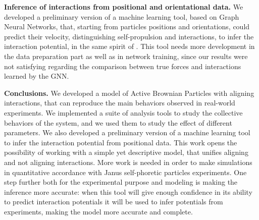 \documentclass[a4paper, notitlepage]{report} %
\begin{document}
	
	\textbf{Inference of interactions from positional and orientational data.} 
	We developed a preliminary version of a machine learning tool, based on Graph Neural Networks, that, starting from particles positions and orientations, could predict their velocity, distinguishing self-propulsion and interactions, to infer the interaction potential, in the same spirit of \cite{ruiz-garcia_discovering_2024}.
	This tool needs more development in the data preparation part as well as in network training, since our results were not satisfying regarding the comparison between true forces and interactions learned by the GNN.

	\textbf{Conclusions.}
	We developed a model of Active Brownian Particles with aligning interactions, that can reproduce the main behaviors observed in real-world experiments.
	We implemented a suite of analysis tools to study the collective behaviors of the system, and we used them to study the effect of different parameters.
	We also developed a preliminary version of a machine learning tool to infer the interaction potential from positional data.
	This work opens the possibility of working with a simple yet descriptive model, that unifies aligning and not aligning interactions.
	More work is needed in order to make simulations in quantitative accordance with Janus self-phoretic particles experiments.
	One step further both for the experimental purpose and modeling is making the inference more accurate: when this tool will give enough confidence in its ability to predict interaction potentials it will be used to infer potentials from experiments, making the model more accurate and complete.
	
\end{document}
